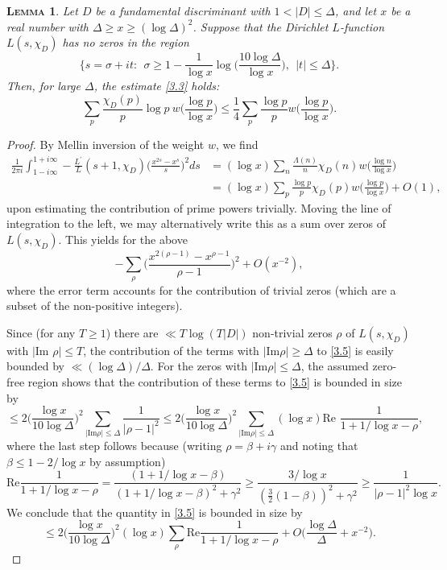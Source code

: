 \documentclass[11pt,makeidx, reqno]{amsart}
\theoremstyle{mystyle}
\newtheorem{lemma}[theorem]{\textsc{Lemma}}
\theoremstyle{definition}
\begin{document}
\begin{lemma} \label{lem3.2}  Let $D$ be a fundamental discriminant with $1 <|D|\le \Delta$, and let $x$ be a real number with $\Delta \ge x \ge (\log \Delta)^2$.   Suppose that the Dirichlet $L$-function $L(s,\chi_D)$ has no zeros in the region 
$$
\Big\{ s= \sigma+it: \ \ \sigma \ge 1- \frac{1}{\log x} \log \Big(\frac{10\log \Delta}{\log x}\Big), \ \ |t| \le \Delta \Big\}.  
$$
Then, for large $\Delta$, the estimate \eqref{3.3} holds: 
$$
\sum_{p} \frac{\chi_D(p)}{p} \log p\  w\Big(\frac{\log p}{\log x} \Big) 
\le \frac 14 \sum_p \frac{\log p}{p} w \Big(\frac{\log p}{\log x}\Big). $$
\end{lemma}
\begin{proof}  By Mellin inversion of the weight $w$, we find 
\begin{align*}
\frac{1}{2\pi i} \int_{1-i\infty}^{1+i\infty} -\frac{L^{\prime}}{L}(s+1,\chi_D) \Big(\frac{x^{2s}-x^s}{s}\Big)^2 ds &= (\log x) \sum_n \frac{\Lambda(n)}{n} \chi_D(n) w\Big(\frac{\log n}{\log x}\Big)\\
&=(\log x) \sum_p \frac{\log p}{p} \chi_D(p) w\Big(\frac{\log p}{\log x}\Big) + O(1), 
\end{align*}
upon estimating the contribution of prime powers trivially. Moving the line of integration to the left, we may alternatively write this as a sum over zeros of $L(s,\chi_D)$.  This yields for the above 
\begin{equation}\label{3.5}
-\sum_\rho \Big(\frac{x^{2(\rho-1)}-x^{\rho-1}}{\rho-1}\Big)^2  
+O(x^{-2}), 
\end{equation}
where the error term accounts for the contribution of trivial zeros (which are a subset of the non-positive integers). 

Since (for any $T\ge 1$) there are $\ll T \log (T|D|)$ non-trivial zeros $\rho$ of $L(s,\chi_D)$ with $|\text{Im }\rho| \le T$, the contribution of the terms with $|\text{Im}\rho| \ge \Delta$ to \eqref{3.5} is easily bounded by $\ll (\log \Delta)/\Delta$.   For the zeros with $|\text{Im} \rho| \le \Delta$, the assumed zero-free region shows that the contribution of these terms to \eqref{3.5} is bounded in size by 
$$ 
\le 2 \Big(\frac{\log x}{10\log \Delta}\Big)^2 \sum_{|\text{Im} \rho| \le \Delta} \frac{1}{|\rho-1|^2} \le 2 \Big(\frac{\log x}{10\log \Delta}\Big)^2 \sum_{|\text{Im}\rho| \le \Delta} (\log x) \text{Re }\frac{1}{1+1/\log x -\rho},
$$
where the last step follows because (writing $\rho = \beta+i\gamma$ and noting that $\beta \le 1- 2/\log x$ by assumption)
$$
\text{Re} \frac{1}{1+1/\log x - \rho} = \frac{(1+1/\log x -\beta)}{(1+1/\log x -\beta)^2 + \gamma^2} \ge \frac{3/\log x}{(\frac 32 (1-\beta))^2 +\gamma^2} \ge \frac{1}{|\rho-1|^2 \log x }. 
$$
We conclude that the quantity in \eqref{3.5} is bounded in size by  
\begin{equation}\label{3.6}
\le 2 \Big(\frac{\log x}{10\log \Delta}\Big)^2 (\log x) \sum_{\rho} \text{Re} \frac{1}{1+1/\log x -\rho} +O\Big(\frac{\log \Delta}{\Delta}+x^{-2}\Big).
\end{equation}


\end{proof}
\end{document}
